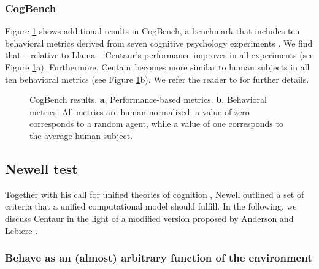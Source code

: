 \documentclass[pdflatex,sn-nature]{sn-jnl}%
\theoremstyle{thmstyleone}%
\theoremstyle{thmstyletwo}%
\theoremstyle{thmstylethree}%
\begin{document}
\subsubsection*{CogBench}

Figure \ref{fig:cogbench} shows additional results in CogBench, a benchmark that includes ten behavioral metrics derived from seven cognitive psychology experiments \cite{pmlr-v235-coda-forno24a}. We find that -- relative to Llama -- Centaur's performance improves in all experiments (see Figure \ref{fig:cogbench}a). Furthermore, Centaur becomes more similar to human subjects in all ten behavioral metrics (see  Figure  \ref{fig:cogbench}b). We refer the reader to \cite{pmlr-v235-coda-forno24a} for further details.

\begin{figure}[H]
    \centering
    \caption{CogBench \cite{pmlr-v235-coda-forno24a} results. \textbf{a}, Performance-based metrics. \textbf{b}, Behavioral metrics. All metrics are human-normalized: a value of zero corresponds to a random agent, while a value of one corresponds to the average human subject.}
    \label{fig:cogbench}
\end{figure}

\subsection*{Newell test}

Together with his call for unified theories of cognition \cite{Newell1990-NEWUTO}, Newell outlined a set of criteria that a unified computational model should fulfill. In the following, we discuss Centaur in the light of a modified version proposed by Anderson and Lebiere \cite{anderson2003newell}. 

\subsubsection*{Behave as an (almost) arbitrary function of the environment}
\end{document}
